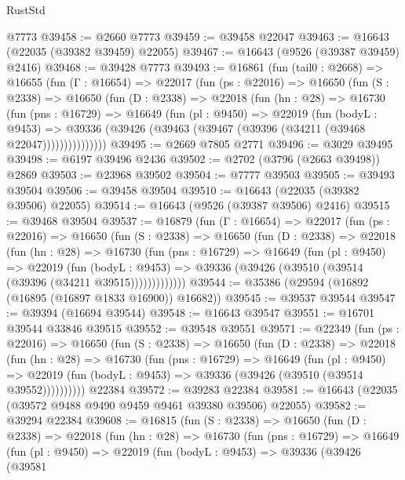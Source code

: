 \begin{lexlean}{RustStd}
\begin{coremodule}
    @7773
@39458 := @2660 @7773
@39459 := @39458 @22047
@39463 := @16643 (@22035 (@39382 @39459) @22055)
@39467 := @16643 (@9526 (@39387 @39459) @2416)
@39468 := @39428 @7773
@39493 := @16861
    (fun (tail0 : @2668) =>
    @16655
      (fun (Γ : @16654) =>
      @22017
        (fun (ps : @22016) =>
        @16650
          (fun (S : @2338) =>
          @16650
            (fun (D : @2338) =>
            @22018
              (fun (hn : @28) =>
              @16730
                (fun (pns : @16729) =>
                @16649
                  (fun (pl : @9450) =>
                  @22019
                    (fun (bodyL : @9453) =>
                    @39336 (@39426 (@39463 (@39467 (@39396 (@34211 (@39468 @22047)))))))))))))))
@39495 := @2669 @7805 @2771
@39496 := @3029 @39495
@39498 := @6197 @39496 @2436
@39502 := @2702 (@3796 (@2663 @39498)) @2869
@39503 := @23968 @39502
@39504 := @7777 @39503
@39505 := @39493 @39504
@39506 := @39458 @39504
@39510 := @16643 (@22035 (@39382 @39506) @22055)
@39514 := @16643 (@9526 (@39387 @39506) @2416)
@39515 := @39468 @39504
@39537 := @16879
    (fun (Γ : @16654) =>
    @22017
      (fun (ps : @22016) =>
      @16650
        (fun (S : @2338) =>
        @16650
          (fun (D : @2338) =>
          @22018
            (fun (hn : @28) =>
            @16730
              (fun (pns : @16729) =>
              @16649
                (fun (pl : @9450) =>
                @22019
                  (fun (bodyL : @9453) =>
                  @39336 (@39426 (@39510 (@39514 (@39396 (@34211 @39515)))))))))))))
@39544 := @35386 (@29594 (@16892 (@16895 (@16897 @1833 @16900)) @16682))
@39545 := @39537 @39544
@39547 := @39394 (@16694 @39544)
@39548 := @16643 @39547
@39551 := @16701 @39544 @33846 @39515
@39552 := @39548 @39551
@39571 := @22349
    (fun (ps : @22016) =>
    @16650
      (fun (S : @2338) =>
      @16650
        (fun (D : @2338) =>
        @22018
          (fun (hn : @28) =>
          @16730
            (fun (pns : @16729) =>
            @16649
              (fun (pl : @9450) =>
              @22019 (fun (bodyL : @9453) => @39336 (@39426 (@39510 (@39514 @39552))))))))))
    @22384
@39572 := @39283 @22384
@39581 := @16643 (@22035 (@39572 @9488 @9490 @9459 @9461 @39380 @39506) @22055)
@39582 := @39294 @22384
@39608 := @16815
    (fun (S : @2338) =>
    @16650
      (fun (D : @2338) =>
      @22018
        (fun (hn : @28) =>
        @16730
          (fun (pns : @16729) =>
          @16649
            (fun (pl : @9450) =>
            @22019
              (fun (bodyL : @9453) =>
              @39336
                (@39426
                  (@39581

\end{coremodule}
\end{lexlean}
